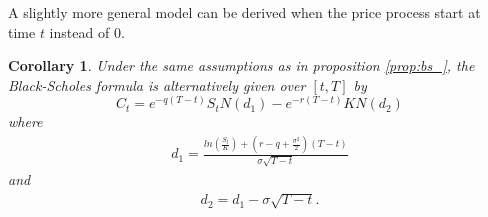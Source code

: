 \documentclass{article}
\newtheorem{cor}[thm]{Corollary}
\theoremstyle{definition}
\theoremstyle{remark}
\newtheorem{remark}[thm]{Remark}
\newcommand{\measure}[1]{\ensuremath{\mathbb{#1}}}
\begin{document}

A slightly more general model can be derived when the price process start at time $t$ instead of $0$.


\begin{cor}\label{cor:bs}
Under the same assumptions as in proposition \ref{prop:bs_}, the \emph{Black-Scholes formula} is alternatively given over $[t,T]$ by
\begin{equation}\label{eq:bs}
C_t=e^{-q(T-t)}S_tN(d_1)-e^{-r(T-t)}KN(d_2)
\end{equation}
where
\begin{align}
d_1=\frac{ln\left( \frac{S_t}{K}\right)+\left( r-q+\frac{\sigma^2}{2}\right)(T-t)}{\sigma\sqrt{T-t}}
\end{align}
and 
\begin{align}
d_2=d_1-\sigma\sqrt{T-t}.
\end{align}
\end{cor}
\end{document}
